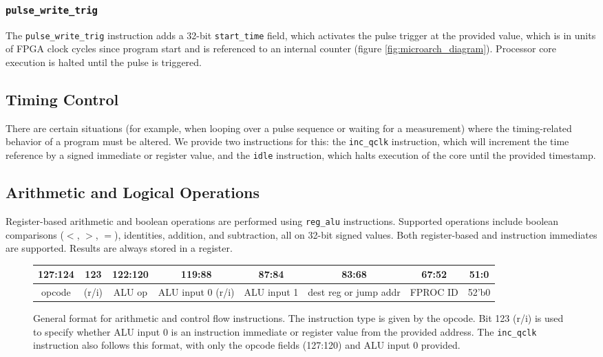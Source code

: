 \documentclass[journal]{IEEEtran}
\begin{document}
\subsubsection{\texttt{pulse\_write\_trig}}

The \verb|pulse_write_trig| instruction adds a 32-bit \verb|start_time| field, which activates the pulse trigger at the provided value, which is in units of FPGA clock cycles since program start and is referenced to an internal counter (figure \ref{fig:microarch_diagram}). Processor core execution is halted until the pulse is triggered.

\subsection{Timing Control}

There are certain situations (for example, when looping over a pulse sequence or waiting for a measurement) where the timing-related behavior of a program must be altered. We provide two instructions for this: the \verb|inc_qclk| instruction, which will increment the time reference by a signed immediate or register value, and the \verb|idle| instruction, which halts execution of the core until the provided timestamp.

\subsection{Arithmetic and Logical Operations}

Register-based arithmetic and boolean operations are performed using \verb|reg_alu| instructions. Supported operations include boolean comparisons ($<$, $>$, $=$), identities, addition, and subtraction, all on 32-bit signed values. Both register-based and instruction immediates are supported. Results are always stored in a register.

\begin{figure}
\centering
\begin{tabular}{|c|c|c|c|c|c|c|c|}
\hline 
127:124 & 123 & 122:120 & 119:88 & 87:84 & 83:68 & 67:52 & 51:0 \\
 \hline 
 opcode & (r/i) &  ALU op & ALU input 0 (r/i) & ALU input 1 & dest reg or jump addr & FPROC ID & 52'b0 \\ \hline

\end{tabular}
\caption{General format for arithmetic and control flow instructions. The instruction type is given by the opcode. Bit 123 (r/i) is used to specify whether ALU input 0 is an instruction immediate or register value from the provided address. The \texttt{inc\_qclk} instruction also follows this format, with only the opcode fields (127:120) and ALU input 0 provided.}
\label{fig:alu_instr}
\end{figure}
\end{document}
